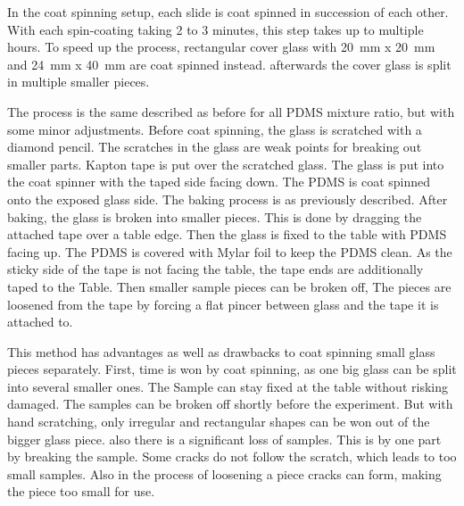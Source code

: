 

In the coat spinning setup, each slide is coat spinned in succession of each other. With each spin-coating taking 2 to 3 minutes, this step takes up to multiple hours. To speed up the process, rectangular cover glass with \SI{20}{\milli\meter} x \SI{20}{\milli\meter} and \SI{24}{\milli\meter} x \SI{40}{\milli\meter} are coat spinned instead. afterwards the cover glass is split in multiple smaller pieces. 

The process is the same described as before for all PDMS mixture ratio, but with some minor adjustments. Before coat spinning, the glass is scratched with a diamond pencil. The scratches in the glass are weak points for breaking out smaller parts. Kapton tape is put over the scratched glass. The glass is put into the coat spinner with the taped side facing down. The PDMS is coat spinned onto the exposed glass side. The baking process is as previously described. After baking, the glass is broken into smaller pieces. This is done by dragging the attached tape over a table edge. Then the glass is fixed to the table with PDMS facing up. The PDMS is covered with Mylar foil to keep the PDMS clean. As the sticky side of the tape is not facing the table, the tape ends are additionally taped to the Table. Then smaller sample pieces can be broken off, The pieces are loosened from the tape by forcing a flat pincer between glass and the tape it is attached to.

This method has advantages as well as drawbacks to coat spinning small glass pieces separately. First, time is won by coat spinning, as one big glass can be split into several smaller ones. The Sample can stay fixed at the table without risking damaged. The samples can be broken off shortly before the experiment. But with hand scratching, only irregular and rectangular shapes can be won out of the bigger glass piece. also there is a significant loss of samples. This is by one part by breaking the sample. Some cracks do not follow the scratch, which leads to too small samples. Also in the process of loosening a piece cracks can form, making the piece too small for use.

